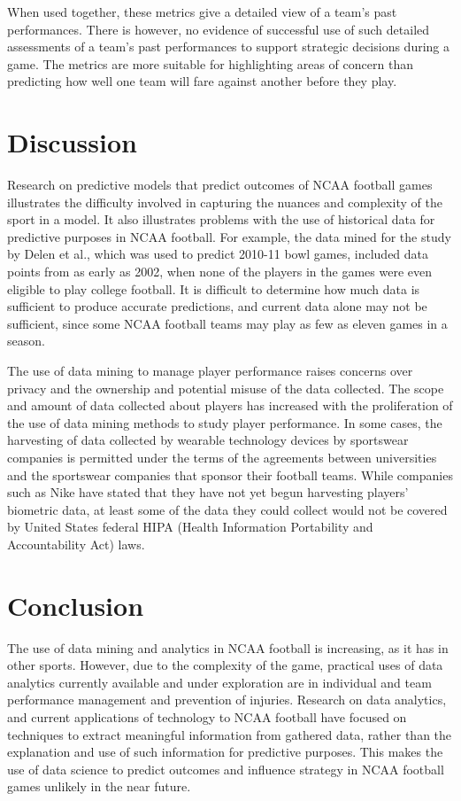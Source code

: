 \documentclass[sigconf]{acmart}
\begin{document}
When used together, these metrics give a detailed view of a team's past performances. There is however, no evidence of successful use of such detailed assessments of a team's past performances to support strategic decisions during a game. The metrics are more suitable for highlighting areas of concern than predicting how well one team will fare against another before they play.


\section{Discussion}
	Research on predictive models that predict outcomes of NCAA football games illustrates the difficulty involved in capturing the nuances and complexity of the sport in a model. It also illustrates problems with the use of historical data for predictive purposes in NCAA football. For example, the data mined for the study by Delen et al., which was used to predict 2010-11 bowl games, included data points from as early as 2002, when none of the players in the games were even eligible to play college football. It is difficult to determine how much data is sufficient to produce accurate predictions, and current data alone may not be sufficient, since some NCAA football teams may play as few as eleven games in a season.
	
The use of data mining to manage player performance raises concerns over privacy and the ownership and potential misuse of the data collected\cite{Taylor2017}. The scope and amount of data collected about players has increased with the proliferation of the use of data mining methods to study player performance. In some cases, the harvesting of data collected by wearable technology devices by sportswear companies is permitted under the terms of the agreements between universities and the sportswear companies that sponsor their football teams. While companies such as Nike have stated that they have not yet begun harvesting players' biometric data, at least some of the data they could collect would not be covered by United States federal HIPA (Health Information Portability and Accountability Act) laws\cite{Tracy2016}.


\section{Conclusion}
The use of data mining and analytics in NCAA football is increasing, as it has in other sports. However, due to the complexity of the game, practical uses of data analytics currently available and under exploration are in individual and team performance management and prevention of injuries. Research on data analytics, and current applications of technology to NCAA football have focused on techniques to extract meaningful information from gathered data, rather than the explanation and use of such information for predictive purposes. This makes the use of data science to predict outcomes and influence strategy in NCAA football games unlikely in the near future.

 
\end{document}
